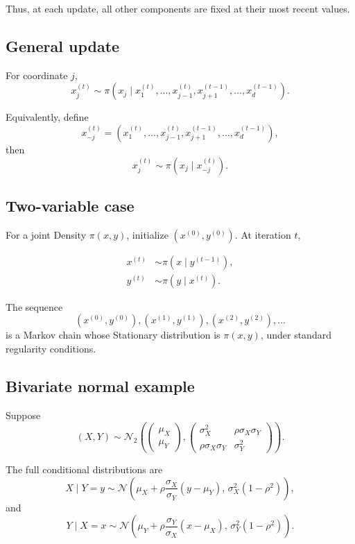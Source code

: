 \documentclass[a4paper, 10pt, onepage]{elegantbook}
\begin{document}
{Thus, at each update, all other components are fixed at their most recent values.

\subsection{General update}

For coordinate \(j\),
\[
x_j^{(t)}
\sim
\pi\!\left(
x_j\mid
x_1^{(t)},\ldots,x_{j-1}^{(t)},
x_{j+1}^{(t-1)},\ldots,x_d^{(t-1)}
\right).
\]

Equivalently, define
\[
x_{-j}^{(t)}
=
\left(
x_1^{(t)},\ldots,x_{j-1}^{(t)},
x_{j+1}^{(t-1)},\ldots,x_d^{(t-1)}
\right),
\]
then
\[
x_j^{(t)}
\sim
\pi\!\left(x_j\mid x_{-j}^{(t)}\right).
\]

\subsection{Two-variable case}

For a joint Density \(\pi(x,y)\), initialize \((x^{(0)},y^{(0)})\). At iteration \(t\),

\begin{align}
x^{(t)}
&\sim
\pi\!\left(x\mid y^{(t-1)}\right),\\[4pt]
y^{(t)}
&\sim
\pi\!\left(y\mid x^{(t)}\right).
\end{align}

The sequence
\[
\left(x^{(0)},y^{(0)}\right),
\left(x^{(1)},y^{(1)}\right),
\left(x^{(2)},y^{(2)}\right),\ldots
\]
is a Markov chain whose Stationary distribution is \(\pi(x,y)\), under standard
regularity conditions.

\subsection{Bivariate normal example}

Suppose
\[
(X,Y)\sim\mathcal N_2\!\left(
\begin{pmatrix}
\mu_X\\
\mu_Y
\end{pmatrix},
\begin{pmatrix}
\sigma_X^2 & \rho\sigma_X\sigma_Y\\
\rho\sigma_X\sigma_Y & \sigma_Y^2
\end{pmatrix}
\right).
\]

The full conditional distributions are
\[
X\mid Y=y
\sim
\mathcal N\!\left(
\mu_X+\rho\frac{\sigma_X}{\sigma_Y}(y-\mu_Y),
\,
\sigma_X^2(1-\rho^2)
\right),
\]
and
\[
Y\mid X=x
\sim
\mathcal N\!\left(
\mu_Y+\rho\frac{\sigma_Y}{\sigma_X}(x-\mu_X),
\,
\sigma_Y^2(1-\rho^2)
\right).
\]

}
\end{document}
